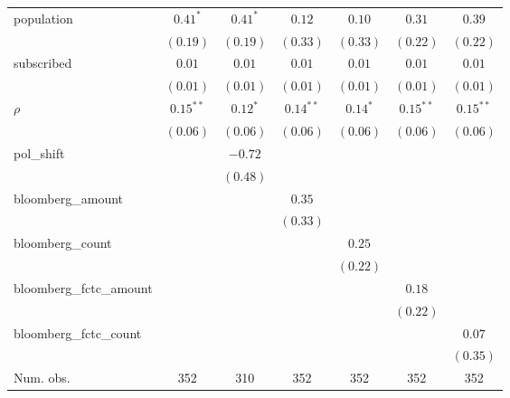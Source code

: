 \begin{table}[!h]
\begin{center}
\begin{tabular}{l c c c c c c }
population              & $0.41^{*}$   & $0.41^{*}$   & $0.12$       & $0.10$       & $0.31$       & $0.39$       \\
                        & $(0.19)$     & $(0.19)$     & $(0.33)$     & $(0.33)$     & $(0.22)$     & $(0.22)$     \\
subscribed              & $0.01$       & $0.01$       & $0.01$       & $0.01$       & $0.01$       & $0.01$       \\
                        & $(0.01)$     & $(0.01)$     & $(0.01)$     & $(0.01)$     & $(0.01)$     & $(0.01)$     \\
$\rho$                  & $0.15^{**}$  & $0.12^{*}$   & $0.14^{**}$  & $0.14^{*}$   & $0.15^{**}$  & $0.15^{**}$  \\
                        & $(0.06)$     & $(0.06)$     & $(0.06)$     & $(0.06)$     & $(0.06)$     & $(0.06)$     \\
pol\_shift              &              & $-0.72$      &              &              &              &              \\
                        &              & $(0.48)$     &              &              &              &              \\
bloomberg\_amount       &              &              & $0.35$       &              &              &              \\
                        &              &              & $(0.33)$     &              &              &              \\
bloomberg\_count        &              &              &              & $0.25$       &              &              \\
                        &              &              &              & $(0.22)$     &              &              \\
bloomberg\_fctc\_amount &              &              &              &              & $0.18$       &              \\
                        &              &              &              &              & $(0.22)$     &              \\
bloomberg\_fctc\_count  &              &              &              &              &              & $0.07$       \\
                        &              &              &              &              &              & $(0.35)$     \\
\midrule
Num. obs.               & 352          & 310          & 352          & 352          & 352          & 352          \\

\end{tabular}
\end{center}
\end{table}
